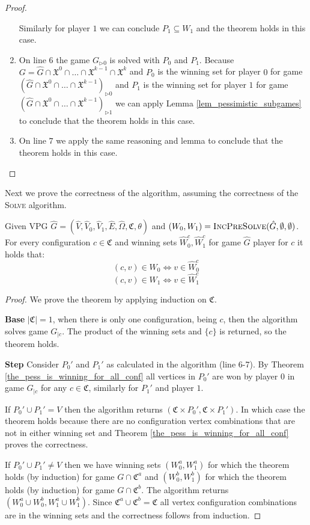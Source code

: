 \begin{theorem}
\begin{proof}
\begin{enumerate}
			Similarly for player $1$ we can conclude $P_1 \subseteq W_1$ and the theorem holds in this case.
			\item On line $6$ the game $G_{\triangleright0}$ is solved with $P_0$ and $P_1$. Because $G = \hat{G} \cap \mathfrak{X}^0 \cap \dots \cap \mathfrak{X}^{k-1} \cap \mathfrak{X}^k$ and $P_0$ is the winning set for player $0$ for game $(\hat{G} \cap \mathfrak{X}^0 \cap \dots \cap \mathfrak{X}^{k-1})_{\triangleright0}$ and $P_1$ is the winning set for player $1$ for game $(\hat{G} \cap \mathfrak{X}^0 \cap \dots \cap \mathfrak{X}^{k-1})_{\triangleright1}$ we can apply Lemma \ref{lem_pessimistic_subgames} to conclude that the theorem holds in this case.
			\item On line $7$ we apply the same reasoning and lemma to conclude that the theorem holds in this case.
		\end{enumerate}
	\end{proof}
\end{theorem}

Next we prove the correctness of the algorithm, assuming the correctness of the \textsc{Solve} algorithm.
\begin{theorem}
	Given VPG $\hat{G} = (\hat{V},\hat{V}_0,\hat{V}_1,\hat{E},\hat{\Omega},\mathfrak{C},\theta)$ and $(W_0,W_1) = \textsc{IncPreSolve}(\hat{G},\emptyset,\emptyset)$. For every configuration $c \in \mathfrak{C}$ and winning sets $\hat{W}_0^c, \hat{W}_1^c$ for game $\hat{G}$ player for $c$ it holds that:
	\[ (c,v) \in W_0 \iff v \in \hat{W}_0^c \]
	\[ (c,v) \in W_1 \iff v \in \hat{W}_1^c \]
	\begin{proof}
		We prove the theorem by applying induction on $\mathfrak{C}$.
		
		\textbf{Base} $|\mathfrak{C}| = 1$, when there is only one configuration, being $c$, then the algorithm solves game $G_{|c}$. The product of the winning sets and $\{c\}$ is returned, so the theorem holds.
		
		\textbf{Step} Consider $P_0'$ and $P_1'$ as calculated in the algorithm (line 6-7). By Theorem \ref{the_pess_is_winning_for_all_conf} all vertices in $P_0'$ are won by player $0$ in game $G_{|c}$ for any $c \in \mathfrak{C}$, similarly for $P_1'$ and player $1$.
		
		If $P_0' \cup P_1' = V$ then the algorithm returns $(\mathfrak{C} \times P_0',\mathfrak{C} \times P_1')$. In which case the theorem holds because there are no configuration vertex combinations that are not in either winning set and Theorem \ref{the_pess_is_winning_for_all_conf} proves the correctness.
		
		If $P_0' \cup P_1' \neq V$ then we have winning sets $(W_0^a, W_1^a)$ for which the theorem holds (by induction) for game $G \cap \mathfrak{C}^a$ and $(W_0^b, W_1^b)$ for which the theorem holds (by induction) for game $G \cap \mathfrak{C}^b$. The algorithm returns $(W_0^a \cup W_0^b, W_1^a \cup W_1^b)$. Since $\mathfrak{C}^a \cup \mathfrak{C}^b = \mathfrak{C}$ all vertex configuration combinations are in the winning sets and the correctness follows from induction.
	\end{proof}
\end{theorem}

